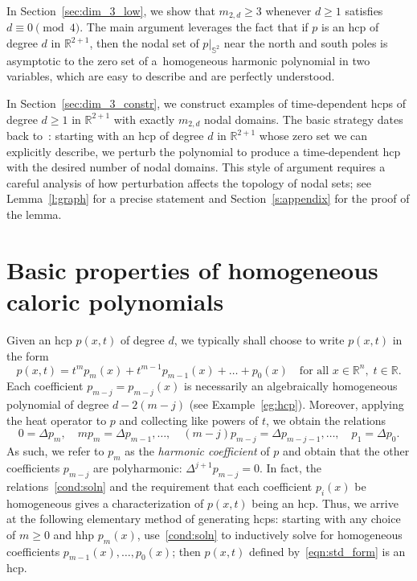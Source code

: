 \documentclass[AHL,Unicode,longabstracts,published]{cedram}
\newcommand{\R}{\mathbb{R}}
\newcommand{\sphere}{\mathbb{S}}
\newcommand{\R}{\mathbb{R}}
\begin{document}
In Section~\ref{sec:dim_3_low}, we show that $m_{2,d} \ge 3$ whenever $d \ge 1$ satisfies $d \equiv 0 \pmod 4$. The main argument leverages the fact that if $p$ is an hcp of degree $d$ in $\R^{2+1}$, then the nodal set of $p|_{\sphere^2}$ near the north and south poles is asymptotic to the zero set of a~homogeneous harmonic polynomial in two variables, which are easy to describe and are perfectly understood.

In Section~\ref{sec:dim_3_constr}, we construct examples of time-dependent hcps of degree $d \ge 1$ in $\R^{2+1}$ with exactly $m_{2,d}$ nodal domains. The basic strategy dates back to~\cite{Lewy77}: starting with an hcp of degree $d$ in $\R^{2+1}$ whose zero set we can explicitly describe, we perturb the polynomial to produce a time-dependent hcp with the desired number of nodal domains. This style of argument requires a careful analysis of how perturbation affects the topology of nodal sets; see Lemma~\ref{l:graph} for a precise statement and Section~\ref{s:appendix} for the proof of the lemma.


\section{Basic properties of homogeneous caloric polynomials}\label{sec:prop}

Given an hcp $p(x,t)$ of degree $d$, we typically shall choose to write $p(x,t)$ in the form
\begin{equation}\label{eqn:std_form}
p(x,t) = t^m p_m(x) + t^{m-1} p_{m-1}(x) + \dots + p_0(x)\quad \text{for all }x\in\R^n, \;t\in\R.
\end{equation}
Each coefficient $p_{m-j}=p_{m-j}(x)$ is necessarily an algebraically homogeneous polynomial of degree $d - 2(m-j)$ (see Example~\ref{eg:hcp}). Moreover, applying the heat operator to $p$ and collecting like powers of $t$, we obtain the relations
\begin{equation}\label{cond:soln}
0 = \Delta p_m,\quad m p_m = \Delta p_{m-1}, \dots, \quad (m-j) p_{m-j} = \Delta p_{m-j-1},\dots,\quad p_1 = \Delta p_0.
\end{equation}
As such, we refer to $p_m$ as the \emph{harmonic coefficient} of $p$ and obtain that the other coefficients $p_{m-j}$ are polyharmonic: $\Delta^{j+1} p_{m-j} = 0$. In fact, the relations~\eqref{cond:soln} and the requirement that each coefficient $p_i(x)$ be homogeneous gives a characterization of $p(x,t)$ being an hcp. Thus, we arrive at the following elementary method of generating hcps: starting with any choice of $m\geq 0$ and hhp $p_m(x)$, use~\eqref{cond:soln} to inductively solve for homogeneous coefficients $p_{m-1}(x), \dots, p_0(x)$; then $p(x,t)$ defined by~\eqref{eqn:std_form} is an hcp.
\end{document}
